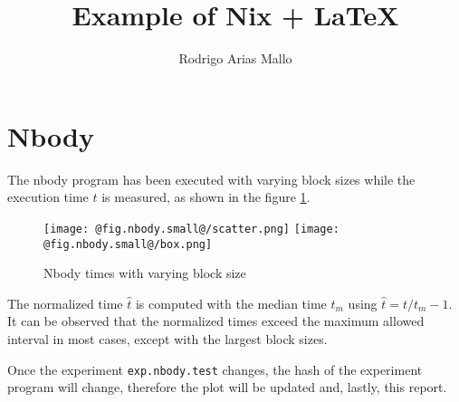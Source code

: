 \documentclass{article}
\begin{document}
\title{Example of Nix + \LaTeX{}}
\author{Rodrigo Arias Mallo}

\maketitle

\section{Nbody}
The nbody program has been executed with varying block sizes while the execution 
time $t$ is measured, as shown in the figure \ref{fig:nbody.test}.
%
\begin{figure}[h]
    \centering
		\texttt{[image: @fig.nbody.small@/scatter.png]}
		\texttt{[image: @fig.nbody.small@/box.png]}
		\caption{Nbody times with varying block size}
		\label{fig:nbody.test}
\end{figure}
%
The normalized time $\hat t$ is computed with the median time $t_m$ using $ \hat 
t = t / t_{m} - 1 $. It can be observed that the normalized times exceed the 
maximum allowed interval in most cases, except with the largest block sizes.

Once the experiment \texttt{exp.nbody.test} changes, the hash of the experiment 
program will change, therefore the plot will be updated and, lastly, this 
report.
\end{document}
